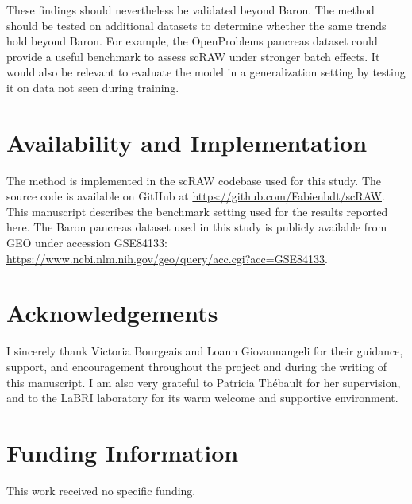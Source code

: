 \documentclass[11pt,a4paper]{article}
\begin{document}
These findings should nevertheless be validated beyond Baron.
The method should be tested on additional datasets to determine
whether the same trends hold beyond Baron. For example, the OpenProblems
pancreas dataset \cite{openproblems_pancreas} could provide a useful benchmark to assess scRAW under
stronger batch effects. It would also be relevant to evaluate the model
in a generalization setting by testing it on data not seen during
training.
\section{Availability and Implementation}

The method is implemented in the scRAW codebase used for this study.
The source code is available on GitHub at
\url{https://github.com/Fabienbdt/scRAW}. This manuscript describes the
benchmark setting used for the results reported here. The Baron pancreas
dataset used in this study is publicly available from GEO under
accession GSE84133:
\url{https://www.ncbi.nlm.nih.gov/geo/query/acc.cgi?acc=GSE84133}.

\section{Acknowledgements}

I sincerely thank Victoria Bourgeais and Loann Giovannangeli for their
guidance, support, and encouragement throughout the project and during
the writing of this manuscript. I am also very grateful to Patricia
Thébault for her supervision, and to the LaBRI laboratory for its warm
welcome and supportive environment.

\section{Funding Information}

This work received no specific funding.
\end{document}
